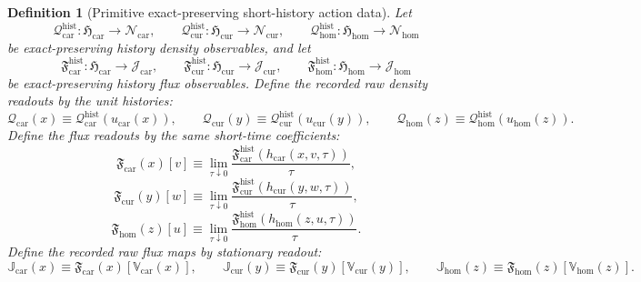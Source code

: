 \documentclass[11pt]{article}
\newcommand{\TensorDensityClass}{\mathscr N_{\mathrm{car}}}
\newcommand{\CurDensityClass}{\mathscr N_{\mathrm{cur}}}
\newcommand{\HomDensityClass}{\mathscr N_{\mathrm{hom}}}
\newcommand{\TensorRawDensity}{\boldsymbol{\mathcal Q}_{\mathrm{car}}}
\newcommand{\CurRawDensity}{\boldsymbol{\mathcal Q}_{\mathrm{cur}}}
\newcommand{\HomRawDensity}{\boldsymbol{\mathcal Q}_{\mathrm{hom}}}
\newcommand{\TensorTransport}{\mathbb V_{\mathrm{car}}}
\newcommand{\CurTransport}{\mathbb V_{\mathrm{cur}}}
\newcommand{\HomTransport}{\mathbb V_{\mathrm{hom}}}
\newcommand{\TensorFluxClass}{\mathscr J_{\mathrm{car}}}
\newcommand{\CurFluxClass}{\mathscr J_{\mathrm{cur}}}
\newcommand{\HomFluxClass}{\mathscr J_{\mathrm{hom}}}
\newcommand{\TensorFlux}{\mathbb J_{\mathrm{car}}}
\newcommand{\CurFlux}{\mathbb J_{\mathrm{cur}}}
\newcommand{\HomFlux}{\mathbb J_{\mathrm{hom}}}
\newcommand{\TensorFluxRead}{\mathfrak F_{\mathrm{car}}}
\newcommand{\CurFluxRead}{\mathfrak F_{\mathrm{cur}}}
\newcommand{\HomFluxRead}{\mathfrak F_{\mathrm{hom}}}
\newcommand{\TensorHistoryClass}{\mathfrak H_{\mathrm{car}}}
\newcommand{\CurHistoryClass}{\mathfrak H_{\mathrm{cur}}}
\newcommand{\HomHistoryClass}{\mathfrak H_{\mathrm{hom}}}
\newtheorem{definition}{Definition}
\begin{document}
\begin{definition}[Primitive exact-preserving short-history action data]
Let
\[
\mathcal Q_{\mathrm{car}}^{\mathrm{hist}}:\TensorHistoryClass\to\TensorDensityClass,\qquad
\mathcal Q_{\mathrm{cur}}^{\mathrm{hist}}:\CurHistoryClass\to\CurDensityClass,\qquad
\mathcal Q_{\mathrm{hom}}^{\mathrm{hist}}:\HomHistoryClass\to\HomDensityClass
\]
be exact-preserving history density observables, and let
\[
\mathfrak F_{\mathrm{car}}^{\mathrm{hist}}:\TensorHistoryClass\to\TensorFluxClass,\qquad
\mathfrak F_{\mathrm{cur}}^{\mathrm{hist}}:\CurHistoryClass\to\CurFluxClass,\qquad
\mathfrak F_{\mathrm{hom}}^{\mathrm{hist}}:\HomHistoryClass\to\HomFluxClass
\]
be exact-preserving history flux observables. Define the recorded raw density readouts by the unit histories:
\begin{equation}
\TensorRawDensity(x)\equiv\mathcal Q_{\mathrm{car}}^{\mathrm{hist}}(u_{\mathrm{car}}(x)),\qquad
\CurRawDensity(y)\equiv\mathcal Q_{\mathrm{cur}}^{\mathrm{hist}}(u_{\mathrm{cur}}(y)),\qquad
\HomRawDensity(z)\equiv\mathcal Q_{\mathrm{hom}}^{\mathrm{hist}}(u_{\mathrm{hom}}(z)).
\label{eq:history_raw_density}
\end{equation}
Define the flux readouts by the same short-time coefficients:
\begin{equation}
\TensorFluxRead(x)[v]
\equiv
\lim_{\tau\downarrow 0}
\frac{\mathfrak F_{\mathrm{car}}^{\mathrm{hist}}(h_{\mathrm{car}}(x,v,\tau))}{\tau},
\label{eq:history_flux_read_car}
\end{equation}
\begin{equation}
\CurFluxRead(y)[w]
\equiv
\lim_{\tau\downarrow 0}
\frac{\mathfrak F_{\mathrm{cur}}^{\mathrm{hist}}(h_{\mathrm{cur}}(y,w,\tau))}{\tau},
\label{eq:history_flux_read_cur}
\end{equation}
\begin{equation}
\HomFluxRead(z)[u]
\equiv
\lim_{\tau\downarrow 0}
\frac{\mathfrak F_{\mathrm{hom}}^{\mathrm{hist}}(h_{\mathrm{hom}}(z,u,\tau))}{\tau}.
\label{eq:history_flux_read_hom}
\end{equation}
Define the recorded raw flux maps by stationary readout:
\begin{equation}
\TensorFlux(x)\equiv\TensorFluxRead(x)[\TensorTransport(x)],\qquad
\CurFlux(y)\equiv\CurFluxRead(y)[\CurTransport(y)],\qquad
\HomFlux(z)\equiv\HomFluxRead(z)[\HomTransport(z)].
\label{eq:history_raw_flux}
\end{equation}


\end{definition}
\end{document}
